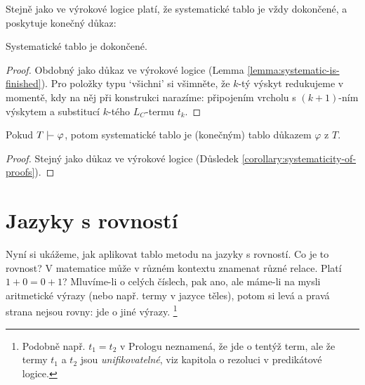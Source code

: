 Stejně jako ve výrokové logice platí, že systematické tablo je vždy dokončené, a poskytuje konečný důkaz:

\begin{lemma}\label{lemma:systematic-is-finished-predicate}
    Systematické tablo je dokončené.
\end{lemma}
\begin{proof}
    Obdobný jako důkaz ve výrokové logice (Lemma \ref{lemma:systematic-is-finished}). Pro položky typu `všichni' si všimněte, že $k$-tý výskyt redukujeme v momentě, kdy na něj při konstrukci narazíme: připojením vrcholu s $(k+1)$-ním výskytem a substitucí $k$-tého $L_C$-termu $t_k$.
\end{proof}

\begin{corollary}\label{corollary:systematicity-of-proofs-predicate}
    Pokud $T\proves\varphi$, potom systematické tablo je (konečným) tablo důkazem $\varphi$ z $T$.
\end{corollary}
\begin{proof}
    Stejný jako důkaz ve výrokové logice (Důsledek \ref{corollary:systematicity-of-proofs}).
\end{proof}


\section{Jazyky s rovností} \label{section:tableaux-equality}

Nyní si ukážeme, jak aplikovat tablo metodu na jazyky s rovností. Co je to rovnost? V matematice může v různém kontextu znamenat různé relace. Platí $1+0=0+1$? Mluvíme-li o celých číslech, pak ano, ale máme-li na mysli aritmetické výrazy (nebo např. termy v jazyce těles), potom si levá a pravá strana nejsou rovny: jde o jiné výrazy. \footnote{Podobně např. $t_1=t_2$ v Prologu neznamená, že jde o tentýž term, ale že termy $t_1$ a $t_2$ jsou \emph{unifikovatelné}, viz kapitola o rezoluci v predikátové logice.}

